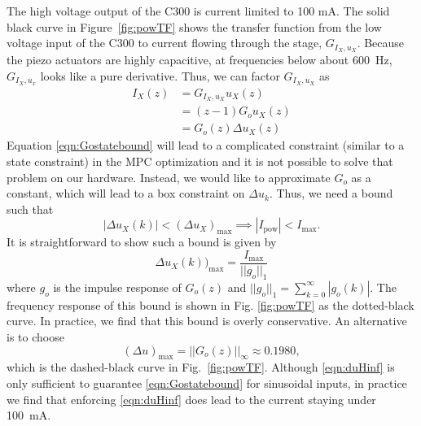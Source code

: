 \documentclass[journal,twocolumn,twoside]{IEEEtran}
\begin{document}
The high voltage output of the C300 is current limited to 100 mA. The solid black curve in Figure~\ref{fig:powTF} shows the transfer function from the low voltage input of the C300 to current flowing through the stage, $G_{I_X,u_X}$. Because the piezo actuators are highly capacitive, at frequencies below about 600~Hz, $G_{I_X,u_x}$ looks like a pure derivative.
Thus, we can factor $G_{I_X,u_X}$ as
\begin{align}
  I_{X}(z) &= G_{I_X,u_X} u_X(z)\\
          & = (z-1) G_o u_X(z)\\
          & = G_o(z) \Delta u_X(z) \label{eqn:Gostatebound}
\end{align}
Equation \eqref{eqn:Gostatebound} will lead to a complicated constraint (similar to a state constraint) in the MPC optimization and it is not possible to solve that problem on our hardware. Instead, we would like to approximate $G_o$ as a constant, which will lead to a box constraint on $\Delta u_k$. Thus, we need a bound such that
\begin{equation}
  |\Delta u_X(k)| < (\Delta u_X)_{\text{max}} \implies |I_{\text{pow}}| < I_{\text{max}}.
\end{equation}
It is straightforward to show such a bound is given by 
\begin{equation}
\Delta u_X(k))_{\text{max}} = \frac{I_{\text{max}}}{||g_o||_1}
\end{equation}
where $g_o$ is the impulse response of $G_o(z)$ and $||g_o||_1 = \sum_{k=0}^{\infty}|g_o(k)|$. The frequency response of this bound is shown in Fig. \ref{fig:powTF} as the dotted-black curve. In practice, we find that this bound is overly conservative. An alternative is to choose
\begin{equation}
(\Delta u)_{\text{max}} = ||G_o(z)||_{\infty}\approx 0.1980, \label{eqn:duHinf}
\end{equation}
which is the dashed-black curve in Fig.~\ref{fig:powTF}. Although \eqref{eqn:duHinf} is only sufficient to guarantee \eqref{eqn:Gostatebound} for sinusoidal inputs, in practice we find that enforcing \eqref{eqn:duHinf} does lead to the current staying under 100~mA.

\end{document}
